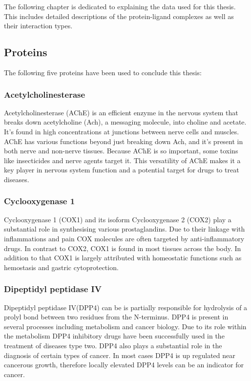 The following chapter is dedicated to explaining the data used for this thesis.
This includes detailed descriptions of the protein-ligand complexes as well as their interaction types.

\subsection{Proteins}
The following five proteins have been used to conclude this thesis:
\subsubsection*{Acetylcholinesterase}
Acetylcholinesterase (AChE) is an efficient enzyme in the nervous system that breaks down 
acetylcholine (Ach), a messaging molecule, into choline and acetate. 
It's found in high concentrations at junctions between nerve cells and muscles.
AChE has various functions beyond just breaking down Ach, 
and it's present in both nerve and non-nerve tissues.
Because AChE is so important, some toxins like insecticides and nerve agents target it.
 This versatility of AChE makes it a key player in nervous system function
 and a potential target for drugs to treat diseases\cite[]{Tripathi2010}.
\subsubsection*{Cyclooxygenase 1}
Cyclooxygenase 1 (COX1) and its isoform Cyclooxygenase 2 (COX2) play a substantial role in 
synthesising various prostaglandins. Due to their linkage with inflammations and pain
COX molecules are often targeted by anti-inflammatory drugs. In contrast to COX2, COX1 is found in most tissues
across the body. In addition to that COX1 is largely attributed with homeostatic functions
such as hemostasis and gastric cytoprotection\cite[]{Rouzer2009}.
\subsubsection*{Dipeptidyl peptidase IV}
Dipeptidyl peptidase IV(DPP4) can be is partially responsible
for hydrolysis of a prolyl bond between two residues from the N-terminus.
DPP4 is present in several processes including metabolism and cancer biology.
Due to its role within the metabolism DPP4 inhibitory drugs have been successfully used in the treatment of diseases type two.
DPP4 also plays a substantial role in the diagnosis of certain types of cancer. 
In most cases DPP4 is up regulated near cancerous growth, therefore locally elevated DPP4 levels can be 
an indicator for cancer\cite[]{Yu2010}.
